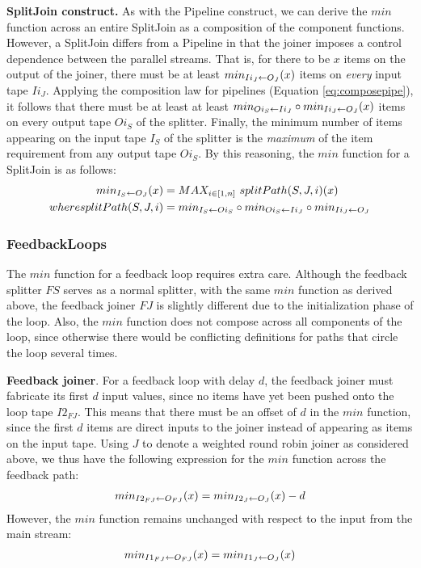 {\bf SplitJoin construct.}  As with the Pipeline construct, we can
derive the $min$ function across an entire SplitJoin as a composition
of the component functions.  However, a SplitJoin differs from a
Pipeline in that the joiner imposes a control dependence between the
parallel streams.  That is, for there to be $x$ items on the output of
the joiner, there must be at least $min_{Ii_J \leftarrow O_J}(x)$ items on {\it
every} input tape $Ii_J$.  Applying the composition law for pipelines
(Equation \ref{eq:composepipe}), it follows that there must be at
least at least $min_{Oi_S \leftarrow Ii_J} \circ min_{Ii_J \leftarrow O_J}(x)$ items on
every output tape $Oi_S$ of the splitter.  Finally, the minimum number
of items appearing on the input tape $I_S$ of the splitter is the {\it
maximum} of the item requirement from any output tape $Oi_S$.  By this
reasoning, the $min$ function for a SplitJoin is as follows:
\begin{align}
\label{eq:splitpath}
min_{I_S \leftarrow O_J}(x) &= MAX_{i \in [1,n]}~splitPath(S, J, i)(x) \\ where
splitPath(S, J, i) &=min_{I_S \leftarrow Oi_S} \circ min_{Oi_S \leftarrow Ii_J} \circ
min_{Ii_J \leftarrow O_J}
\end{align}

\subsubsection{FeedbackLoops}
\label{sec:timefl}

The $min$ function for a feedback loop requires extra care. Although
the feedback splitter $FS$ serves as a normal splitter, with the same
$min$ function as derived above, the feedback joiner $FJ$ is slightly
different due to the initialization phase of the loop.  Also, the
$min$ function does not compose across all components of the loop,
since otherwise there would be conflicting definitions for paths that
circle the loop several times.

{\bf Feedback joiner}.  For a feedback loop with delay $d$, the
feedback joiner must fabricate its first $d$ input values, since no
items have yet been pushed onto the loop tape $I2_{FJ}$.  This means
that there must be an offset of $d$ in the $min$ function, since the
first $d$ items are direct inputs to the joiner instead of appearing
as items on the input tape.  Using $J$ to denote a weighted round
robin joiner as considered above, we thus have the following
expression for the $min$ function across the feedback path:
\begin{align*}
min_{I2_{FJ} \leftarrow O_{FJ}}(x) = min_{I2_J \leftarrow O_J}(x) - d
\end{align*}
However, the $min$ function remains unchanged with respect to the
input from the main stream:
\begin{align*}
min_{I1_{FJ} \leftarrow O_{FJ}}(x) = min_{I1_J \leftarrow O_J}(x)
\end{align*}

